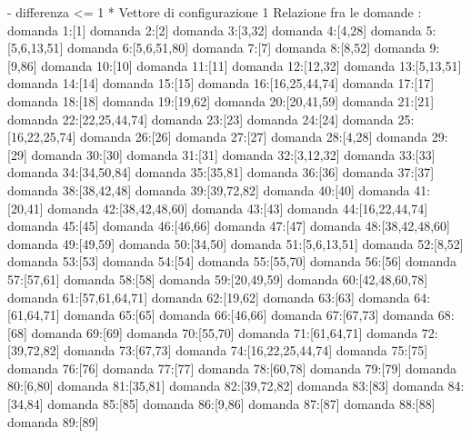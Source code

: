 - differenza <= 1
* Vettore di configurazione 1
Relazione fra le domande :
domanda 1:[1]
domanda 2:[2]
domanda 3:[3,32]
domanda 4:[4,28]
domanda 5:[5,6,13,51]
domanda 6:[5,6,51,80]
domanda 7:[7]
domanda 8:[8,52]
domanda 9:[9,86]
domanda 10:[10]
domanda 11:[11]
domanda 12:[12,32]
domanda 13:[5,13,51]
domanda 14:[14]
domanda 15:[15]
domanda 16:[16,25,44,74]
domanda 17:[17]
domanda 18:[18]
domanda 19:[19,62]
domanda 20:[20,41,59]
domanda 21:[21]
domanda 22:[22,25,44,74]
domanda 23:[23]
domanda 24:[24]
domanda 25:[16,22,25,74]
domanda 26:[26]
domanda 27:[27]
domanda 28:[4,28]
domanda 29:[29]
domanda 30:[30]
domanda 31:[31]
domanda 32:[3,12,32]
domanda 33:[33]
domanda 34:[34,50,84]
domanda 35:[35,81]
domanda 36:[36]
domanda 37:[37]
domanda 38:[38,42,48]
domanda 39:[39,72,82]
domanda 40:[40]
domanda 41:[20,41]
domanda 42:[38,42,48,60]
domanda 43:[43]
domanda 44:[16,22,44,74]
domanda 45:[45]
domanda 46:[46,66]
domanda 47:[47]
domanda 48:[38,42,48,60]
domanda 49:[49,59]
domanda 50:[34,50]
domanda 51:[5,6,13,51]
domanda 52:[8,52]
domanda 53:[53]
domanda 54:[54]
domanda 55:[55,70]
domanda 56:[56]
domanda 57:[57,61]
domanda 58:[58]
domanda 59:[20,49,59]
domanda 60:[42,48,60,78]
domanda 61:[57,61,64,71]
domanda 62:[19,62]
domanda 63:[63]
domanda 64:[61,64,71]
domanda 65:[65]
domanda 66:[46,66]
domanda 67:[67,73]
domanda 68:[68]
domanda 69:[69]
domanda 70:[55,70]
domanda 71:[61,64,71]
domanda 72:[39,72,82]
domanda 73:[67,73]
domanda 74:[16,22,25,44,74]
domanda 75:[75]
domanda 76:[76]
domanda 77:[77]
domanda 78:[60,78]
domanda 79:[79]
domanda 80:[6,80]
domanda 81:[35,81]
domanda 82:[39,72,82]
domanda 83:[83]
domanda 84:[34,84]
domanda 85:[85]
domanda 86:[9,86]
domanda 87:[87]
domanda 88:[88]
domanda 89:[89]

